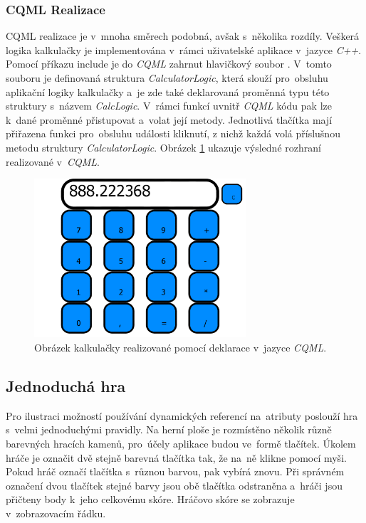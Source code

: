 \documentclass[11pt,twoside,a4paper]{book}
\begin{document}
\subsubsection{CQML Realizace}
CQML realizace je v~mnoha směrech podobná, avšak s~několika rozdíly. Veškerá logika kalkulačky je implementována v~rámci uživatelské aplikace v~jazyce \textit{C++}. Pomocí příkazu include je do \textit{CQML} zahrnut hlavičkový soubor . V~tomto souboru je definovaná struktura \textit{CalculatorLogic}, která slouží pro~obsluhu aplikační logiky kalkulačky a~je zde také deklarovaná proměnná typu této struktury s~názvem \textit{CalcLogic}. V~rámci funkcí uvnitř \textit{CQML} kódu pak lze k~dané proměnné přistupovat a~volat její metody. Jednotlivá tlačítka mají přiřazena funkci pro~obsluhu události kliknutí, z nichž každá volá příslušnou metodu struktury \textit{CalculatorLogic}. Obrázek \ref{fig:outCalcCQML} ukazuje výsledné rozhraní realizované v~\textit{CQML}.
\begin{figure}[!ht]
\begin{center}
  \includegraphics[width=0.7\textwidth]{cqmlCalc}
\caption{{\label{fig:outCalcCQML}}Obrázek kalkulačky realizované pomocí deklarace v~jazyce \textit{CQML}.}
\end{center}
\end{figure}



\subsection{Jednoduchá hra}
Pro ilustraci možností používání dynamických referencí na~atributy poslouží hra s~velmi jednoduchými pravidly. Na herní ploše je rozmístěno několik různě barevných hracích kamenů, pro~účely aplikace budou ve~formě tlačítek. Úkolem hráče je označit dvě stejně barevná tlačítka tak, že na~ně klikne pomocí myši. Pokud hráč označí tlačítka s~různou barvou, pak vybírá znovu. Při správném označení dvou tlačítek stejné barvy jsou obě tlačítka odstraněna a~hráči jsou přičteny body k~jeho celkovému skóre. Hráčovo skóre se zobrazuje v~zobrazovacím řádku.
\end{document}
